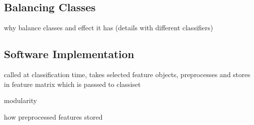                 
    
            
        
    
    \subsection{Balancing Classes}
    \label{subsec:pl-featpreproc-bal}
        \begin{sitemize}
            \item{why balance classes and effect it has (details with different classifiers)}
        \end{sitemize}
    
    \subsection{Software Implementation}
    \label{subsec:pl-featpreproc-software}
        \begin{sitemize}
            \item{called at classification time, takes selected feature objects, preprocesses and stores in feature matrix which is passsed to classiset}
            \item{modularity}
            \item{how preprocessed features stored}
        \end{sitemize}
    